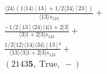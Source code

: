\documentclass[varwidth, border=5pt]{standalone}
\begin{document}
\begin{my}
$\begin{gathered}
\scriptscriptstyle\frac{⟨24⟩(1⟨14⟩[13]+1/2⟨24⟩[23])}{⟨13⟩s_{123}} +\\
\scriptscriptstyle\frac{-1/2[13]⟨24⟩⟨4|1+2|3]}{⟨3|1+2|3]s_{123}} +\\
\scriptscriptstyle\frac{1/2⟨12⟩⟨14⟩⟨34⟩[13]²}{⟨13⟩⟨3|1+2|3]s_{123}} +\\
\scriptscriptstyle(2143𝟓,\;\text{True},\;-) \phantom{+}
\end{gathered}$
\end{my}
\end{document}
